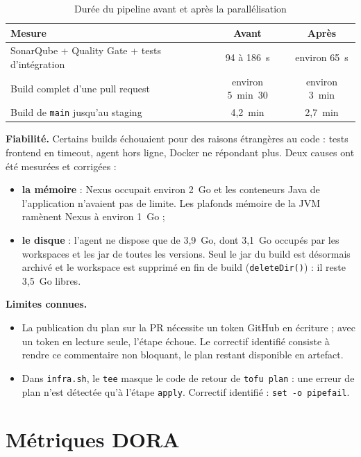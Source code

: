 \documentclass[11pt,a4paper]{report}
\begin{document}
\begin{table}[H]
  \centering
  \small
  \begin{tabular}{@{}lcc@{}}
    \toprule
    \textbf{Mesure} & \textbf{Avant} & \textbf{Après} \\
    \midrule
    SonarQube + Quality Gate + tests d'intégration & 94 à 186~s & environ 65~s \\
    Build complet d'une pull request & environ 5~min~30 & environ 3~min \\
    Build de \texttt{main} jusqu'au staging & 4,2~min & 2,7~min \\
    \bottomrule
  \end{tabular}
  \caption{Durée du pipeline avant et après la parallélisation}
\end{table}

\textbf{Fiabilité.} Certains builds échouaient pour des raisons étrangères au code : tests frontend en timeout, agent hors ligne, Docker ne répondant plus. Deux causes ont été mesurées et corrigées :
\begin{itemize}
  \item \textbf{la mémoire} : Nexus occupait environ 2~Go et les conteneurs Java de l'application n'avaient pas de limite. Les plafonds mémoire de la JVM ramènent Nexus à environ 1~Go ;
  \item \textbf{le disque} : l'agent ne dispose que de 3,9~Go, dont 3,1~Go occupés par les workspaces et les jar de toutes les versions. Seul le jar du build est désormais archivé et le workspace est supprimé en fin de build (\texttt{deleteDir()}) : il reste 3,5~Go libres.
\end{itemize}

\textbf{Limites connues.}
\begin{itemize}
  \item La publication du plan sur la PR nécessite un token GitHub en écriture ; avec un token en lecture seule, l'étape échoue. Le correctif identifié consiste à rendre ce commentaire non bloquant, le plan restant disponible en artefact.
  \item Dans \texttt{infra.sh}, le \texttt{tee} masque le code de retour de \texttt{tofu plan} : une erreur de plan n'est détectée qu'à l'étape \texttt{apply}. Correctif identifié : \texttt{set -o pipefail}.
\end{itemize}

\chapter{Métriques DORA}\label{chap:dora}
\end{document}
